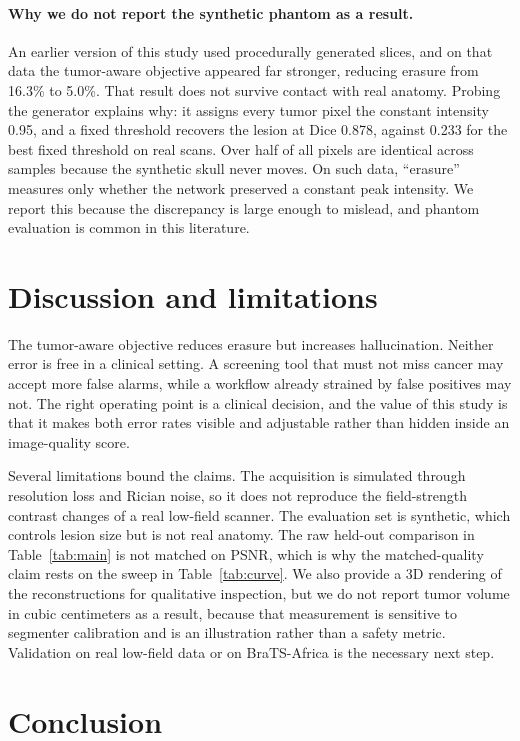 \documentclass[11pt,a4paper]{article}
\begin{document}
\paragraph{Why we do not report the synthetic phantom as a result.}
An earlier version of this study used procedurally generated slices, and on that data the tumor-aware objective appeared far stronger, reducing erasure from 16.3\% to 5.0\%. That result does not survive contact with real anatomy. Probing the generator explains why: it assigns every tumor pixel the constant intensity 0.95, and a fixed threshold recovers the lesion at Dice 0.878, against 0.233 for the best fixed threshold on real scans. Over half of all pixels are identical across samples because the synthetic skull never moves. On such data, ``erasure'' measures only whether the network preserved a constant peak intensity. We report this because the discrepancy is large enough to mislead, and phantom evaluation is common in this literature.

\section{Discussion and limitations}

The tumor-aware objective reduces erasure but increases hallucination. Neither error is free in a clinical setting. A screening tool that must not miss cancer may accept more false alarms, while a workflow already strained by false positives may not. The right operating point is a clinical decision, and the value of this study is that it makes both error rates visible and adjustable rather than hidden inside an image-quality score.

Several limitations bound the claims. The acquisition is simulated through resolution loss and Rician noise, so it does not reproduce the field-strength contrast changes of a real low-field scanner. The evaluation set is synthetic, which controls lesion size but is not real anatomy. The raw held-out comparison in Table~\ref{tab:main} is not matched on PSNR, which is why the matched-quality claim rests on the sweep in Table~\ref{tab:curve}. We also provide a 3D rendering of the reconstructions for qualitative inspection, but we do not report tumor volume in cubic centimeters as a result, because that measurement is sensitive to segmenter calibration and is an illustration rather than a safety metric. Validation on real low-field data or on BraTS-Africa is the necessary next step.

\section{Conclusion}
\end{document}
